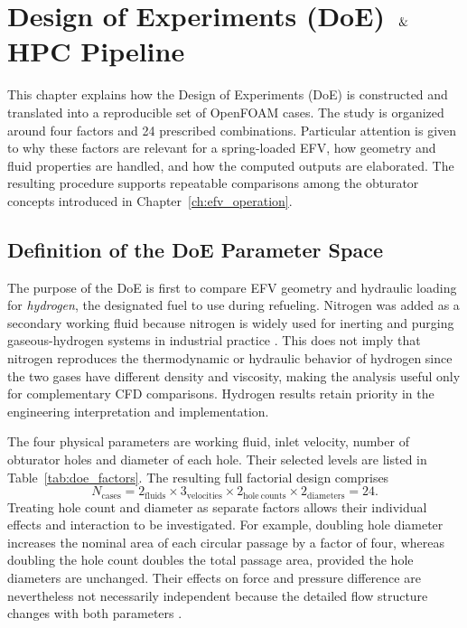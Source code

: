 \chapter{Design of Experiments (DoE) $\And$ HPC Pipeline}
\label{ch:doe}

This chapter explains how the Design of Experiments (DoE) is constructed and translated into a reproducible set of OpenFOAM cases. The study is organized around four factors and 24 prescribed combinations. Particular attention is given to why these factors are relevant for a spring-loaded EFV, how geometry and fluid properties are handled, and how the computed outputs are elaborated. The resulting procedure supports repeatable comparisons among the obturator concepts introduced in Chapter~\ref{ch:efv_operation}.

\section{Definition of the DoE Parameter Space}
\label{sec:doe_parameters}

The purpose of the DoE is first to compare EFV geometry and hydraulic loading for \emph{hydrogen}, the designated fuel to use during refueling. Nitrogen was added as a secondary working fluid because nitrogen is widely used for inerting and purging gaseous-hydrogen systems in industrial practice \cite{h2tools_purging,doe_hydrogen_practices}. This does not imply that nitrogen reproduces the thermodynamic or hydraulic behavior of hydrogen since the two gases have different density and viscosity, making the analysis useful only for complementary CFD comparisons. Hydrogen results retain priority in the engineering interpretation and implementation.

The four physical parameters are working fluid, inlet velocity, number of obturator holes and diameter of each hole. Their selected levels are listed in Table~\ref{tab:doe_factors}. The resulting full factorial design comprises
\begin{equation}
    N_{\mathrm{cases}}=2_{\mathrm{fluids}}\times3_{\mathrm{velocities}}\times
    2_{\mathrm{hole\ counts}}\times2_{\mathrm{diameters}}=24.
    \label{eq:doe_cases}
\end{equation}
Treating hole count and diameter as separate factors allows their individual effects and interaction to be investigated. For example, doubling hole diameter increases the nominal area of each circular passage by a factor of four, whereas doubling the hole count doubles the total passage area, provided the hole diameters are unchanged. Their effects on force and pressure difference are nevertheless not necessarily independent because the detailed flow structure changes with both parameters \cite{white2016,crane410}.

